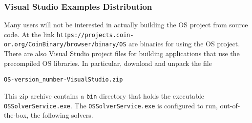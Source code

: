 \documentclass[11pt]{article}
\renewcommand{\_}{{\char"5F}}
\renewcommand{\{}{{\char"7B}}
\renewcommand{\}}{{\char"7D}}
\renewcommand{\^}{{\char"0D}}
\renewcommand{\'}{{\char"0D}}
\newif\ifipopt  \ipopttrue      %
\newcommand{\UrlOsWin}{https://projects.coin-or.org/CoinBinary/browser/binary/OS}
\begin{document}

\subsubsection{Visual Studio Examples Distribution}\label{section:vsexamples}

Many users will not be interested in actually building the OS project from source code.   At the link
{\tt\UrlOsWin} are  binaries for using the OS project.
There are also Visual Studio project files for building applications that use the precompiled OS libraries.
In particular, download and unpack the file

\begin{verbatim}
OS-version_number-VisualStudio.zip
\end{verbatim}

This zip archive contains a  {\tt bin} directory that holds  the executable  {\tt OSSolverService.exe}.
The {\tt OSSolverService.exe} is configured to run, out-of-the-box,   the following solvers.
\end{document}
